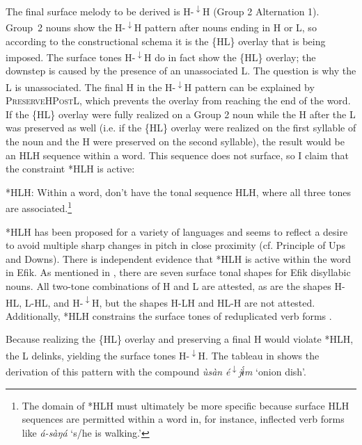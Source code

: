 \documentclass[output=paper]{langscibook}
\begin{document}
The final surface melody to be derived is H-\textsuperscript{$\downarrow$}H (Group 2 Alternation 1). Group~2 nouns show the H-\textsuperscript{$\downarrow$}H pattern after nouns ending in H or L, so according to the constructional schema it is the \{HL\} overlay that is being imposed. The surface tones H-\textsuperscript{$\downarrow$}H do in fact show the \{HL\} overlay; the downstep is caused by the presence of an unassociated L. The question is why the L is unassociated. The final H in the H-\textsuperscript{$\downarrow$}H pattern can be explained by \textsc{PreserveHPostL}, which prevents the overlay from reaching the end of the word. If the \{HL\} overlay were fully realized on a Group 2 noun while the H after the L was preserved as well (i.e. if the \{HL\} overlay were realized on the first syllable of the noun and the H were preserved on the second syllable), the result would be an HLH sequence within a word. This sequence does not surface, so I claim that the constraint *HLH is active:

\ea\label{ex:glewwe:4} 
{*HLH: Within a word, don’t have the tonal sequence HLH, where all three tones are associated.\footnote{The domain of *HLH must ultimately be more specific because surface HLH sequences are permitted within a word in, for instance, inflected verb forms like \textit{á-sàŋá} ‘s/he is walking.’} }\\
\z

*HLH has been proposed for a variety of languages \citep{Cahill2007b,McPherson2016c} and seems to reflect a desire to avoid multiple sharp changes in pitch in close proximity (cf.  Principle of Ups and Downs). There is independent evidence that *HLH is active within the word in Efik. As mentioned in , there are seven surface tonal shapes for Efik disyllabic nouns. All two-tone combinations of H and L are attested, as are the shapes H-HL, L-HL, and H-\textsuperscript{$\downarrow$}H, but the shapes H-LH and HL-H are not attested. Additionally, *HLH constrains the surface tones of reduplicated verb forms \citep{Glewwe2017}.

Because realizing the \{HL\} overlay and preserving a final H would violate *HLH, the L delinks, yielding the surface tones H-\textsuperscript{$\downarrow$}H. The tableau in  shows the derivation of this pattern with the compound \textit{ùsàn} \textit{é\textsuperscript{$\downarrow$}jɨ́m} ‘onion dish’.
\end{document}
